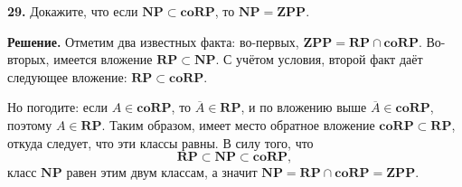 \textbf{29.} Докажите, что если $\mathbf{NP} \subset \mathbf{coRP}$, то $\mathbf{NP} = \mathbf{ZPP}$.

\textbf{Решение.} Отметим два известных факта: во-первых, $\mathbf{ZPP} = \mathbf{RP} \cap \mathbf{coRP}$. Во-вторых, имеется вложение $\mathbf{RP} \subset \mathbf{NP}$. С учётом условия, второй факт даёт следующее вложение: $\mathbf{RP} \subset \mathbf{coRP}$.

Но погодите: если $A \in \mathbf{coRP}$, то $\overline{A} \in \mathbf{RP}$, и по вложению выше $\overline{A} \in \mathbf{coRP}$, поэтому $A \in \mathbf{RP}$. Таким образом, имеет место обратное вложение $\mathbf{coRP} \subset \mathbf{RP}$, откуда следует, что эти классы равны. В силу того, что
\[
\mathbf{RP} \subset \mathbf{NP} \subset \mathbf{coRP},
\]
класс $\mathbf{NP}$ равен этим двум классам, а значит $\mathbf{NP} = \mathbf{RP} \cap \mathbf{coRP} = \mathbf{ZPP}$.